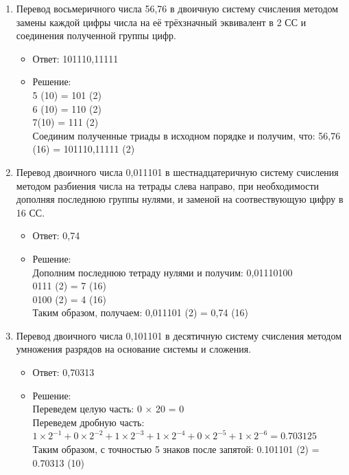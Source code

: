 \documentclass[14pt,final,oneside]{extreport}%
\begin{document}
\begin{enumerate}
        \item Перевод восьмеричного числа 56,76 в двоичную систему счисления методом замены каждой цифры числа на её трёхзначный эквивалент в 2 СС и соединения полученной группы цифр.
        \begin{itemize}
            \item Ответ: 101110,11111
            \item Решение: \\
                5 (10) = 101 (2) \\
                6 (10) = 110 (2) \\
                7(10) = 111 (2) \\
                Соединим полученные триады в исходном порядке и получим, что: 56,76 (16) = 101110,11111 (2)
        \end{itemize}

        \item Перевод двоичного числа 0,011101 в шестнадцатеричную систему счисления методом разбиения числа на тетрады слева направо, при необходимости дополняя последнюю группы нулями, и заменой на соотвествующую цифру в 16 СС.
        \begin{itemize}
            \item Ответ: 0,74
            \item Решение: \\
                Дополним последнюю тетраду нулями и получим: 0,01110100 \\
                0111 (2) = 7 (16) \\
                0100 (2) = 4 (16) \\
                Таким образом, получаем:  0,011101 (2) = 0,74 (16)
        \end{itemize}

        \item Перевод двоичного числа 0,101101 в десятичную систему счисления методом умножения разрядов на основание системы и сложения.
        \begin{itemize}
            \item Ответ: 0,70313
            \item Решение: \\
                Переведем целую часть: 0 × 20 = 0 \\
                Переведем дробную часть: \( 1 \times 2^{-1} + 0 \times 2^{-2} + 1 \times 2^{-3} + 1 \times 2^{-4} + 0 \times 2^{-5} + 1 \times 2^{-6} = 0.703125 \) \\
                Таким образом, с точностью 5 знаков после запятой: 0.101101 (2) = 0.70313 (10)
        \end{itemize}


\end{enumerate}
\end{document}
